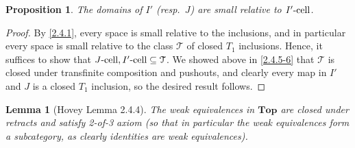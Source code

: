 \documentclass{amsart}
\theoremstyle{plain}
\newtheorem{proposition}[theorem]{Proposition}
\newtheorem{lemma}[theorem]{Lemma}
\theoremstyle{definition}
\newcommand{\Top}{\mbf{Top}}
\newcommand{\sseq}{\subseteq}
\newcommand{\0}{\mathbf{0}}
\newcommand{\cT}{\mathcal T}
\newcommand{\mbf}[1]{\mathbf{#1}}
\renewcommand{\(}{\left(}
\renewcommand{\)}{\right)}
\newcommand{\cell}{\text-\mathrm{cell}}
\begin{document}
\begin{proposition}\label{domains_of_I'/J_small_rel_I'-cell/J-cell}
  The domains of $I'$ (resp.\ $J$) are small relative to $I'\cell$.
\end{proposition}
\begin{proof}
  By \autoref{2.4.1}, every space is small relative to the inclusions, and in particular every space is small relative to the class $\cT$ of closed $T_1$ inclusions. Hence, it suffices to show that $J\cell,I'\cell\sseq\cT$. We showed above in \autoref{2.4.5-6} that $\cT$ is closed under transfinite composition and pushouts, and clearly every map in $I'$ and $J$ is a closed $T_1$ inclusion, so the desired result follows.
\end{proof}

\begin{lemma}[Hovey Lemma 2.4.4]\label{2.4.4}
  The weak equivalences in $\Top$ are closed under retracts and satisfy 2-of-3 axiom (so that in particular the weak equivalences form a subcategory, as clearly identities are weak equivalences).
\end{lemma}
\end{document}
